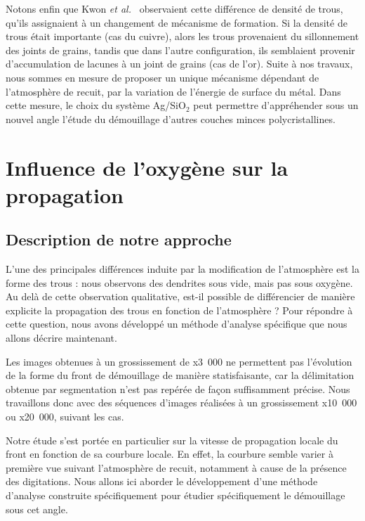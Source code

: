 Notons enfin que Kwon \textit{et al.}~\cite{kwon2003comparison} observaient cette différence de densité de trous, qu’ils assignaient à un changement de mécanisme de formation. Si la densité de trous était importante (cas du cuivre), alors les trous provenaient du sillonnement des joints de grains, tandis que dans l’autre configuration, ils semblaient provenir d’accumulation de lacunes à un joint de grains (cas de l’or). Suite à nos travaux, nous sommes en mesure de proposer un unique mécanisme dépendant de l’atmosphère de recuit, par la variation de l'énergie de surface du métal. Dans cette mesure, le choix du système Ag/SiO$_2$ peut permettre d'appréhender sous un nouvel angle l’étude du démouillage d’autres couches minces polycristallines.\par 
\section{Influence de l'oxygène sur la propagation}
		\subsection{Description de notre approche}
L’une des principales différences induite par la modification de l’atmosphère est la forme des trous : nous observons des dendrites sous vide, mais pas sous oxygène. Au delà de cette observation qualitative, est-il possible de différencier de manière explicite la propagation des trous en fonction de l’atmosphère ? Pour répondre à cette question, nous avons développé un méthode d’analyse spécifique que nous allons décrire maintenant.\par 
Les images obtenues à un grossissement de x3~000 ne permettent pas l'évolution de la forme du front de démouillage de manière statisfaisante, car la délimitation  obtenue par segmentation n'est pas repérée de façon suffisamment précise. Nous travaillons donc avec des séquences d'images réalisées à un grossissement x10~000 ou x20~000, suivant les cas.\par 
Notre étude s’est portée en particulier sur la vitesse de propagation locale du front en fonction de sa courbure locale. En effet, la courbure semble varier à première vue suivant l’atmosphère de recuit, notamment à cause de la présence des digitations. Nous allons ici aborder le développement d’une méthode d’analyse construite spécifiquement pour étudier spécifiquement le démouillage sous cet angle.\par 

